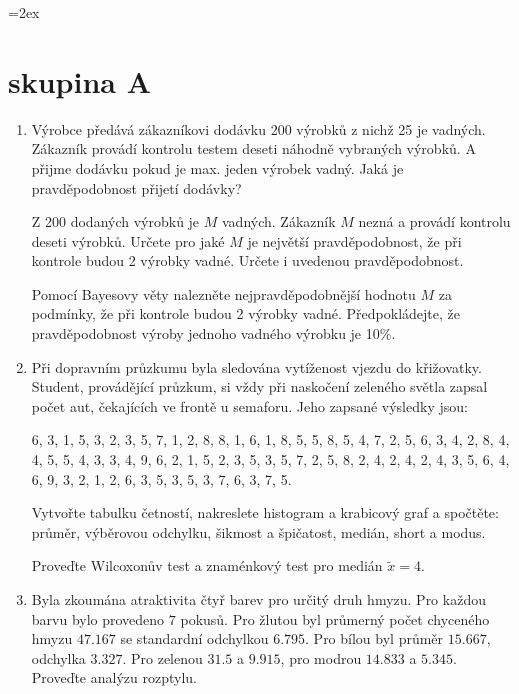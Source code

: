 \documentclass[a4paper,10pt]{article}
\begin{document}
\parskip=2ex
\parindent=0pt
\pagestyle{empty}
 \section*{skupina A}

 \begin{enumerate}
  \item Výrobce předává zákazníkovi dodávku 200 výrobků z nichž 25 je vadných. Zákazník provádí kontrolu testem deseti náhodně vybraných výrobků. A přijme dodávku pokud je max. jeden výrobek vadný. Jaká je pravděpodobnost přijetí dodávky? 

  Z 200 dodaných výrobků je $M$ vadných. Zákazník $M$ nezná a provádí kontrolu deseti výrobků. Určete pro jaké $M$
  je největší pravděpodobnost, že při kontrole budou 2 výrobky vadné. Určete i uvedenou pravděpodobnost.

  Pomocí Bayesovy věty nalezněte nejpravděpodobnější hodnotu $M$ za podmínky, že při kontrole budou 2 výrobky vadné.
  Předpokládejte, že pravděpodobnost výroby jednoho vadného výrobku je 10\%.

  \item Při dopravním průzkumu byla sledována vytíženost vjezdu do křižovatky.
  Student, provádějící průzkum, si vždy při naskočení zeleného světla zapsal počet aut, čekajících 
  ve frontě u semaforu. Jeho zapsané výsledky jsou:

  6, 3, 1, 5, 3, 2, 3, 5, 7, 1, 2, 8, 8, 1, 6, 1, 8, 5, 5, 8, 5, 4, 7, 2, 5, 6, 3, 4, 2, 8, 4, 4, 5, 5, 4,
3, 3, 4, 9, 6, 2, 1, 5, 2, 3, 5, 3, 5, 7, 2, 5, 8, 2, 4, 2, 4, 2, 4, 3, 5, 6, 4, 6, 9, 3, 2, 1, 2, 6, 3,
5, 3, 5, 3, 7, 6, 3, 7, 5.

  Vytvořte tabulku četností, nakreslete histogram a krabicový graf a spočtěte: průměr, výběrovou odchylku, šikmost a špičatost, medián, short a modus.
  
  Proveďte Wilcoxonův test a znaménkový test pro medián $\tilde{x}=4$.
  
  
  \item Byla zkoumána atraktivita čtyř barev pro určitý druh hmyzu. Pro každou barvu bylo provedeno $7$ pokusů.
        Pro žlutou byl průmerný počet chyceného hmyzu $47.167$ se standardní odchylkou $6.795$. Pro bílou byl průměr 
        $15.667$, odchylka $3.327$. Pro zelenou $31.5$ a $9.915$, pro modrou $14.833$ a $5.345$. Proveďte analýzu rozptylu.
\end{enumerate}

\pagebreak
\end{document}
